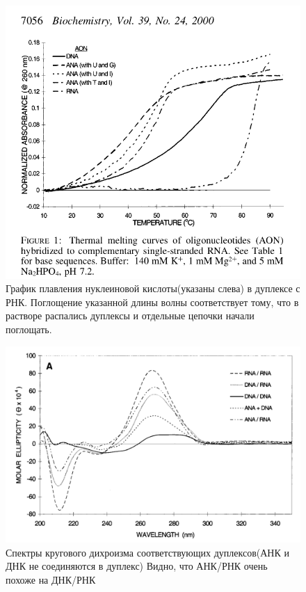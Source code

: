 	\begin{figure}[H]
		\centering
		\includegraphics[scale = 0.3]{Pictures/4_4}
		\caption{График плавления нуклеиновой кислоты(указаны слева) в дуплексе с РНК. Поглощение указанной длины волны соответствует тому, что в растворе распались дуплексы и отдельные цепочки начали поглощать.}
	\end{figure}
	\begin{figure}[H]
		\centering
		\includegraphics[scale = 0.3]{Pictures/4_5}
		\caption{Спектры кругового дихроизма соответствующих дуплексов(АНК и ДНК не соединяются в дуплекс)
			Видно, что АНК/РНК очень похоже на ДНК/РНК}
	\end{figure}
